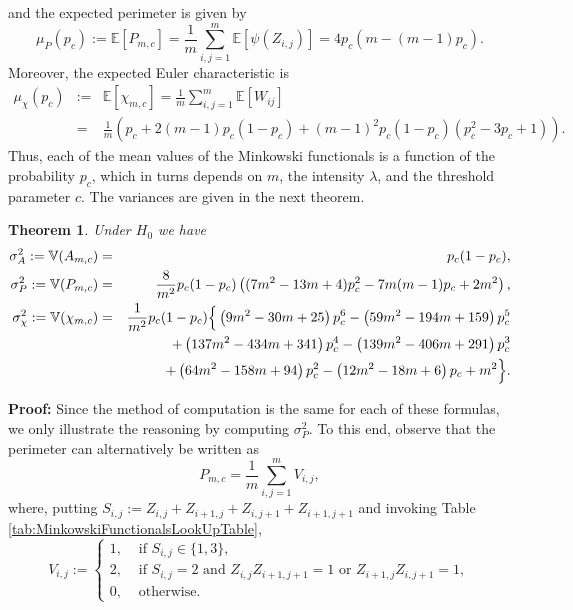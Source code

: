 \documentclass[12pt]{article}
\def\BV{\mathbb{V}}
\newtheorem{theorem}{\bf{Theorem}}[section]
\begin{document}
and the expected perimeter is given by
\begin{equation*}
\mu_P(p_c):=\mathbb{E}\left[P_{m,c}\right]=\frac{1}{m}\sum_{i,j=1}^m\mathbb{E}\left[\psi(Z_{i,j})\right]=4p_c(m-(m-1)p_c).
\end{equation*}
Moreover, the expected Euler characteristic is
\begin{eqnarray*}
\mu_\chi(p_c)&:=&\mathbb{E}\left[\chi_{m,c}\right]=\frac{1}{m}\sum_{i,j=1}^{m}\mathbb{E}\left[W_{ij}\right]\\
& = & \frac{1}{m} \left(p_c+2(m-1)p_c(1-p_c) +(m-1)^2p_c(1-p_c)(p_c^2-3p_c+1)\right).
\end{eqnarray*}
Thus, each of the mean values of the Minkowski functionals is a function of the probability $p_c$, which in turns depends on $m$, the intensity $\lambda$, and the threshold parameter $c$. The variances are given in the next theorem.
%
%
\begin{theorem}\label{varMF}
Under $H_0$ we have
\begin{eqnarray*}
\sigma^2_A:=\BV(A_{m,c})&=&p_c(1-p_c),\\
\sigma^2_{P}:=\BV(P_{m,c})&=&\frac{8}{m^2}p_c(1-p_c)\left((7m^2-13m+4)p_c^2-7m(m-1)p_c+2m^2\right),\\
\sigma^2_\chi:=\BV(\chi_{m,c})&=&\frac{1}{m^2}p_c(1-p_c)\Big{\{}\left(9m^2-30m+25\right)p_c^6-\left(59m^2-194m+159\right)p_c^5\\
&& +\left(137m^2-434m+341\right)p_c^4-\left(139m^2-406m+291\right)p_c^3\\
&&+\left(64m^2-158m+94\right)p_c^2-\left(12m^2-18m+6\right)p_c+m^2\Big{\}}.
\end{eqnarray*}
\end{theorem}
%
%
{\bf Proof:} Since the method of computation is the same for each of these formulas, we only illustrate the reasoning by computing $\sigma^2_{P}$.
To this end, observe that the perimeter can alternatively be written as
\begin{equation}\label{defpmc}
P_{m,c}=\frac{1}{m}\sum_{i,j=1}^{m}V_{i,j},
\end{equation}
where, putting $S_{i,j} := Z_{i,j} + Z_{i+1,j} + Z_{i,j+1}+ Z_{i+1,j+1}$ and invoking Table \ref{tab:MinkowskiFunctionalsLookUpTable},
\begin{equation} \label{defvij}
V_{i,j} := \left\{\begin{array}{ll}
1, & \text{ if } S_{i,j} \in \{1,3\},\\
2, & \text{ if } S_{i,j} = 2 \text{ and }  Z_{i,j}Z_{i+1,j+1} = 1 \text{ or } Z_{i+1,j}Z_{i,j+1} = 1,\\
0, & \text{ otherwise}.
\end{array}\right.
\end{equation}
\end{document}
